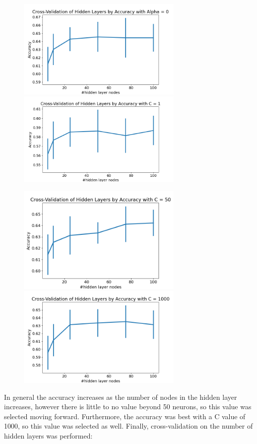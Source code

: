 \documentclass[12pt, a4]{article} %
\begin{document}
\begin{figure}[h]
\includegraphics[width=8cm]{crossValLayers3[newData,acc,A0].png}
\includegraphics[width=8cm]{crossValLayers3[newData,acc,C1].png}
\end{figure}
\begin{figure}[h]
\includegraphics[width=8cm]{crossValLayers3[newData,acc,C50].png}
\includegraphics[width=8cm]{crossValLayers3[newData,acc,C1000].png}
\end{figure}
In general the accuracy increases as the number of nodes in the hidden layer increases, however there is little to no value beyond 50 neurons, so this value was selected moving forward.  Furthermore, the accuracy was best with a C value of 1000, so this value was selected as well.  Finally, cross-validation on the number of hidden layers was performed: 
\end{document}
